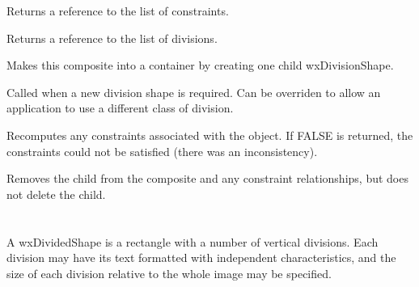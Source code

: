 Returns a reference to the list of constraints.



Returns a reference to the list of divisions.

\label{wxcompositeshapemakecontainer}


Makes this composite into a container by creating one child wxDivisionShape.



Called when a new division shape is required. Can be overriden to allow an application
to use a different class of division.

\label{wxcompositeshaperecompute}


Recomputes any constraints associated with the object. If FALSE is returned,
the constraints could not be satisfied (there was an inconsistency).



Removes the child from the composite and any constraint relationships, but does not
delete the child.

\section{}\label{wxdividedshape}

A wxDividedShape is a rectangle with a number of vertical divisions. Each
division may have its text formatted with independent characteristics, and
the size of each division relative to the whole image may be specified.






